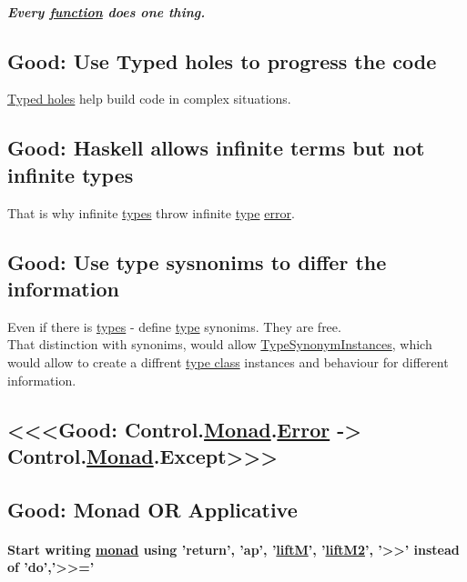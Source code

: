 \documentclass[11pt]{article}
\begin{document}
\subparagraph{Every \hyperref[orgeb5cddb]{function} does one thing.}
\label{sec:org8f79a40}

\subsection{\label{org87a63b5}Good: Use Typed holes to progress the code}
\label{sec:org312f9ee}
\hyperref[org6a09380]{Typed holes} help build code in complex situations.\\

\subsection{\label{org63365ba}Good: Haskell allows infinite terms but not infinite types}
\label{sec:orgafe9421}
That is why infinite \hyperref[org3927fd9]{types} throw infinite \hyperref[org4fbaeb8]{type} \hyperref[orgb69b647]{error}.\\

\subsection{\label{org8cda3a3}Good: Use type sysnonims to differ the information}
\label{sec:orgbab6530}
Even if there is \hyperref[org3927fd9]{types} - define \hyperref[org4fbaeb8]{type} synonims. They are free.\\
That distinction with synonims, would allow \hyperref[org4f19817]{TypeSynonymInstances}, which would allow to create a diffrent \hyperref[orga4a5066]{type class} instances and behaviour for different information.\\

\subsection{<<<Good: Control.\hyperref[org268aaf1]{Monad}.\hyperref[orgb69b647]{Error} -> Control.\hyperref[org268aaf1]{Monad}.Except>>>}
\label{sec:org77999d1}

\subsection{\label{org7a19dba}Good: Monad OR Applicative}
\label{sec:orga227adc}

\paragraph{Start writing \hyperref[org268aaf1]{monad} using 'return', 'ap', '\hyperref[org913e03e]{liftM}', '\hyperref[orgbab1ec7]{liftM2}', '>>' instead of 'do','>>='}
\label{sec:org2b12712}
\end{document}
